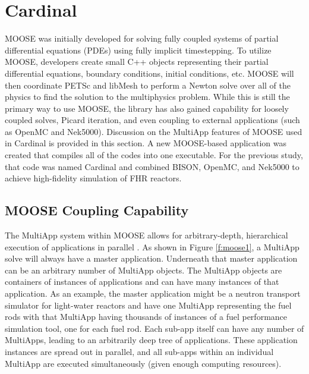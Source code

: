 \section{Cardinal}
\label{s:cardinal}

MOOSE was initially developed for solving fully coupled systems of partial differential equations (PDEs) using fully implicit timestepping. To utilize MOOSE, developers create small C++ objects representing their partial differential equations, boundary conditions, initial conditions, etc. MOOSE will then coordinate PETSc and libMesh \cite{kirk2006libmesh} to perform a Newton solve over all of the physics to find the solution to the multiphysics problem. While this is still the primary way to use MOOSE, the library has also gained capability for loosely coupled solves, Picard iteration, and even coupling to external applications (such as OpenMC and Nek5000). Discussion on the MultiApp features of MOOSE used in Cardinal is provided in this section. A new MOOSE-based application was created \cite{cardinal}  that compiles all of the codes into one executable. For the previous study, that code was named Cardinal and combined BISON, OpenMC, and Nek5000 to achieve high-fidelity simulation of FHR reactors.

\subsection{MOOSE Coupling Capability}

The MultiApp system within MOOSE allows for arbitrary-depth, hierarchical execution of applications in parallel \cite{gaston2015physics}. As shown in Figure \ref{f:moose1}, a MultiApp solve will always have a master application. Underneath that master application can be an arbitrary number of MultiApp objects. The MultiApp objects are containers of instances of applications and can have many instances of that application. As an example, the master application might be a neutron transport simulator for light-water reactors and have one MultiApp representing the fuel rods with that MultiApp having thousands of instances of a fuel performance simulation tool, one for each fuel rod. Each sub-app itself can have any number of MultiApps, leading to an arbitrarily deep tree of applications. These application instances are spread out in parallel, and all sub-apps within an individual MultiApp are executed simultaneously (given enough computing resources).

